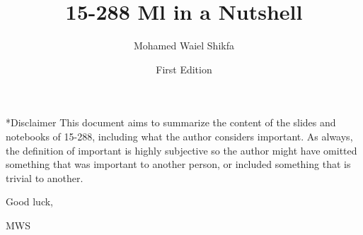 \documentclass[notitlepage]{report}
\title{\textcolor{chaptergreen}{15-288 Ml in a Nutshell}}
\date{First Edition}
\author{Mohamed Waiel Shikfa}
\makeatletter
\def\chapter{\@ifstar\@schapter\@chapter}
\def\@chapter#1{%
  \refstepcounter{chapter}%
  \addcontentsline{toc}{chapter}{\protect\numberline{\thechapter}#1}%
  \chaptermark{#1}%
  {\par\vspace{2em}\centering\LARGE\bfseries
   \textcolor{chaptergreen}{Chapter \thechapter\\#1}\par\vspace{1em}}%
}
\def\@schapter#1{%
  {\par\vspace{1em}\centering\LARGE\bfseries
   \textcolor{chaptergreen}{#1}\par\vspace{1em}}%
}
\makeatother
\begin{document}
\maketitle

\chapter*{Disclaimer}
This document aims to summarize the content of the slides and notebooks of 15-288, including
what the author considers important. As always, the definition of important is
highly subjective so the author might have omitted something that was
important to another person, or included something that is trivial to another.

Good luck,

MWS

\tableofcontents
\clearpage

\clearpage
\clearpage
\clearpage
\clearpage
\clearpage
\clearpage
\clearpage

\clearpage
\clearpage
\clearpage
\clearpage
\clearpage
\clearpage
\end{document}
